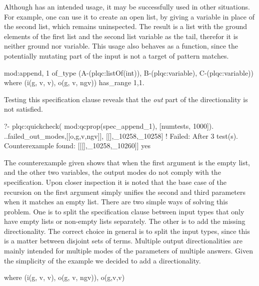 Although  has an intended usage, it may be successfully
used in other situations.
%
For example, one can use it to create an open list, by giving a variable
in place of the second list, which remains uninspected.
%
The result is a list with the ground elements of the first list and the
second list variable as the tail, therefor it is neither ground nor
variable.
%
This usage also behaves as a function, since the potentially mutating
part of the input is not a target of pattern matches.
%
\begin{yapcode}
 {mod:append, 1}
   of_type (A-(plqc:listOf(int)),
     B-(plqc:variable), C-(plqc:variable))
   where (i(g, v, v), o(g, v, ngv))
   has_range {1,1}.
\end{yapcode}
%
Testing this specification clause reveals that the \emph{out} part of
the directionality is not satisfied.
%
\begin{yapcode}
   ?- plqc:quickcheck(
        mod:qcprop(spec_append_1),
        [{numtests, 1000}]).
 ..{failed_out_modes,[[o,g,v,ngv]],
                     [[],_10258,_10258]}
 !
 Failed: After 3 test(s).
 Counterexample found: [[[],_10258,_10260]] 
 yes
\end{yapcode}
%
The counterexample given shows that when the first argument is the empty
list, and the other two variables, the output modes do not comply with
the specification.
%
Upon closer inspection it is noted that the base case of the recursion
on the first argument simply unifies the second and third parameters
when it matches an empty list.
%
There are two simple ways of solving this problem.
%
One is to split the specification clause between input types that only
have empty lists or non-empty lists separately.
%
The other is to add the missing directionality.
%
The correct choice in general is to split the input types, since this is
a matter between disjoint sets of terms.
%
Multiple output directionalities are mainly intended for multiple modes
of the parameters of multiple answers.
%
Given the simplicity of the example we decided to add a directionality.
%
\begin{yapcode}
   where (i(g, v, v), o(g, v, ngv)), o(g,v,v)
\end{yapcode}



